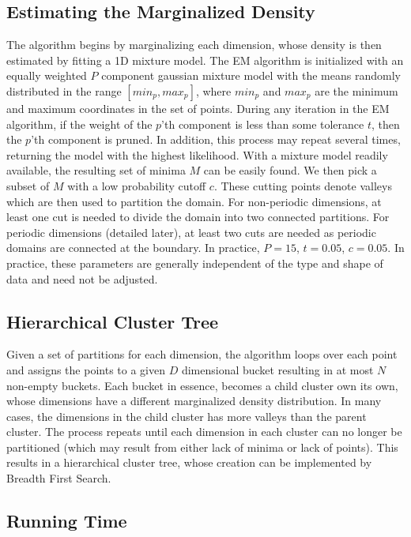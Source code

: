 \documentclass{acm_proc_article-sp}
\begin{document}
\subsection{Estimating the Marginalized Density}
The algorithm begins by marginalizing each dimension, whose density is then estimated by fitting a 1D mixture model. The EM algorithm is initialized with an equally weighted $P$ component gaussian mixture model with the means randomly distributed in the range $[min_p, max_p]$, where $min_p$ and $max_p$ are the minimum and maximum coordinates in the set of points. During any iteration in the EM algorithm, if the weight of the $p$'th component is less than some tolerance $t$, then the $p$'th component is pruned. In addition, this process may repeat several times, returning the model with the highest likelihood. With a mixture model readily available, the resulting set of minima $M$ can be easily found. We then pick a subset of $M$ with a low probability cutoff $c$. These cutting points denote valleys which are then used to partition the domain. For non-periodic dimensions, at least one cut is needed to divide the domain into two connected partitions. For periodic dimensions (detailed later), at least two cuts are needed as periodic domains are connected at the boundary. In practice, $P=15$, $t=0.05$, $c=0.05$. In practice, these parameters are generally independent of the type and shape of data and need not be adjusted. 

\subsection{Hierarchical Cluster Tree}
 Given a set of partitions for each dimension, the algorithm loops over each point and assigns the points to a given $D$ dimensional bucket resulting in at most $N$ non-empty buckets. Each bucket in essence, becomes a child cluster own its own, whose dimensions have a different marginalized density distribution. In many cases, the dimensions in the child cluster has more valleys than the parent cluster. The process repeats until each dimension in each cluster can no longer be partitioned (which may result from either lack of minima or lack of points). This results in a hierarchical cluster tree, whose creation can be implemented by Breadth First Search.

\subsection{Running Time}
\end{document}
